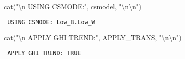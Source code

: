 \documentclass[
  10pt,
  a4paper,oneside]{article}
\newenvironment{Shaded}{\begin{snugshade}}{\end{snugshade}}
\newcommand{\FunctionTok}[1]{\textcolor[rgb]{0.00,0.00,0.00}{#1}}
\newcommand{\NormalTok}[1]{#1}
\newcommand{\SpecialCharTok}[1]{\textcolor[rgb]{0.00,0.00,0.00}{#1}}
\newcommand{\StringTok}[1]{\textcolor[rgb]{0.31,0.60,0.02}{#1}}
\begin{document}
\begin{Shaded}
\begin{Highlighting}[]
\FunctionTok{cat}\NormalTok{(}\StringTok{"}\SpecialCharTok{\textbackslash{}n}\StringTok{ USING CSMODE:"}\NormalTok{,    csmodel,     }\StringTok{"}\SpecialCharTok{\textbackslash{}n\textbackslash{}n}\StringTok{"}\NormalTok{)}
\end{Highlighting}
\end{Shaded}

\begin{verbatim}
 USING CSMODE: Low_B.Low_W 
\end{verbatim}

\begin{Shaded}
\begin{Highlighting}[]
\FunctionTok{cat}\NormalTok{(}\StringTok{"}\SpecialCharTok{\textbackslash{}n}\StringTok{ APPLY GHI TREND:"}\NormalTok{, APPLY\_TRANS, }\StringTok{"}\SpecialCharTok{\textbackslash{}n\textbackslash{}n}\StringTok{"}\NormalTok{)}
\end{Highlighting}
\end{Shaded}

\begin{verbatim}
 APPLY GHI TREND: TRUE 
\end{verbatim}
\end{document}
